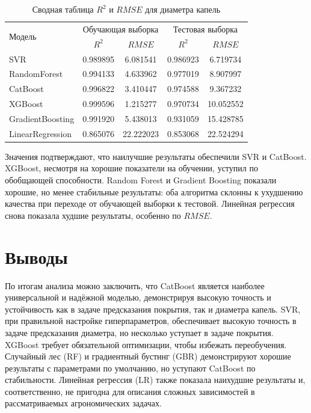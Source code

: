 \begin{table}[htbp!]
	\centering\small
	\caption{Сводная таблица $R^2$ и $RMSE$ для диаметра капель}
	\label{tab:droplet-size-table}		
	\begin{tabular}{|l|c|c|c|c|}
		\hline
		\multirow{2}{*}{Модель} & \multicolumn{2}{|c|}{Обучающая выборка} & \multicolumn{2}{c|}{Тестовая выборка}\\\cline{2-5} 
		& $R^2$ & $RMSE$ & $R^2$ & $RMSE$\\\hline
		SVR&0.989895&6.081541&0.986923&6.719734\\
		RandomForest&0.994133&4.633962&0.977019&8.907997\\
		CatBoost&0.996822&3.410447&0.974588&9.367232\\
		XGBoost&0.999596&1.215277&0.970734&10.052552\\
		GradientBoosting&0.991920&5.438013&0.931059&15.428785\\
		LinearRegression&0.865076&22.222023&0.853068&22.524294\\
		\hline
	\end{tabular}	
	\normalsize
\end{table}

Значения подтверждают, что наилучшие результаты обеспечили SVR и CatBoost. XGBoost, несмотря на хорошие показатели на обучении, уступил по обобщающей способности. Random Forest и Gradient Boosting показали хорошие, но менее стабильные результаты: оба алгоритма склонны к ухудшению качества при переходе от обучающей выборки к тестовой. Линейная регрессия снова показала худшие результаты, особенно по $RMSE$.

\section{Выводы}

По итогам анализа можно заключить, что CatBoost является наиболее универсальной и надёжной моделью, демонстрируя высокую точность и устойчивость как в задаче предсказания покрытия, так и диаметра капель. SVR, при правильной настройке гиперпараметров, обеспечивает высокую точность в задаче предсказания диаметра, но несколько уступает в задаче покрытия. XGBoost требует обязательной оптимизации, чтобы избежать переобучения. Случайный лес (RF) и градиентный бустинг (GBR) демонстрируют хорошие результаты с параметрами по умолчанию, но уступают CatBoost по стабильности. Линейная регрессия (LR) также показала наихудшие результаты и, соответственно, не пригодна для описания сложных зависимостей в рассматриваемых агрономических задачах.

